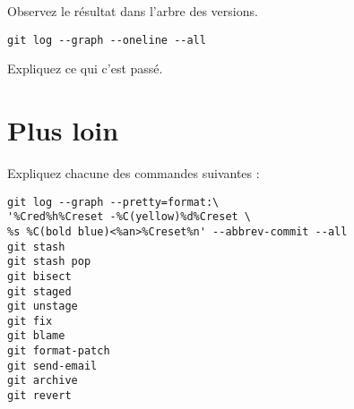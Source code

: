 \documentclass[a4paper]{article}
\begin{document}
Observez le résultat dans l'arbre des versions. 
\begin{verbatim}
git log --graph --oneline --all
\end{verbatim}

Expliquez ce qui c'est passé.

\section{Plus loin}

Expliquez chacune des commandes suivantes :
\begin{verbatim}
git log --graph --pretty=format:\
'%Cred%h%Creset -%C(yellow)%d%Creset \
%s %C(bold blue)<%an>%Creset%n' --abbrev-commit --all
git stash 
git stash pop
git bisect
git staged
git unstage
git fix 
git blame 
git format-patch
git send-email
git archive
git revert
\end{verbatim}
\end{document}
